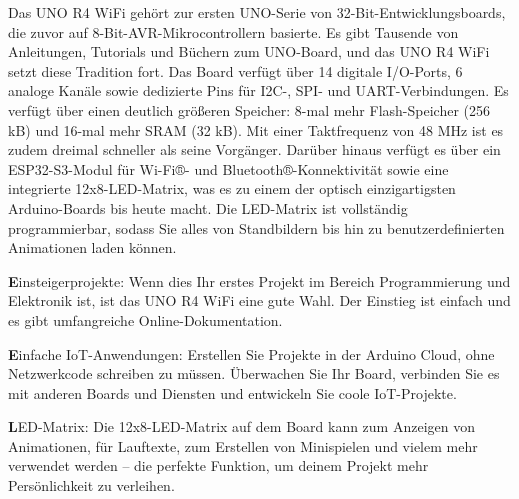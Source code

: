 	Das UNO R4 WiFi gehört zur ersten UNO-Serie von 32-Bit-Entwicklungsboards, die zuvor auf 8-Bit-AVR-Mikrocontrollern basierte.
	Es gibt Tausende von Anleitungen, Tutorials und Büchern zum UNO-Board, und das UNO R4 WiFi setzt diese Tradition fort.
	Das Board verfügt über 14 digitale I/O-Ports, 6 analoge Kanäle sowie dedizierte Pins für I2C-, SPI- und UART-Verbindungen. Es verfügt über einen deutlich größeren Speicher: 8-mal mehr Flash-Speicher (256 kB) und 16-mal mehr SRAM (32 kB). Mit einer Taktfrequenz von 48 MHz ist es zudem dreimal schneller als seine Vorgänger.
	Darüber hinaus verfügt es über ein ESP32-S3-Modul für Wi-Fi®- und Bluetooth®-Konnektivität sowie eine integrierte 12x8-LED-Matrix, was es zu einem der optisch einzigartigsten Arduino-Boards bis heute macht. Die LED-Matrix ist vollständig programmierbar, sodass Sie alles von Standbildern bis hin zu benutzerdefinierten Animationen laden können.
	\begin{itemize}{
	\item \textbf Einsteigerprojekte: Wenn dies Ihr erstes Projekt im Bereich Programmierung und Elektronik ist, ist das UNO R4 WiFi eine gute Wahl. Der Einstieg ist einfach und es gibt umfangreiche Online-Dokumentation.
	\item \textbf Einfache IoT-Anwendungen: Erstellen Sie Projekte in der Arduino Cloud, ohne Netzwerkcode schreiben zu müssen. Überwachen Sie Ihr Board, verbinden Sie es mit anderen Boards und Diensten und entwickeln Sie coole IoT-Projekte.
	\item \textbf LED-Matrix: Die 12x8-LED-Matrix auf dem Board kann zum Anzeigen von Animationen, für Lauftexte, zum Erstellen von Minispielen und vielem mehr verwendet werden – die perfekte Funktion, um deinem Projekt mehr Persönlichkeit zu verleihen.

} \end{itemize}
\cite{Arduino:2026}
%
%
